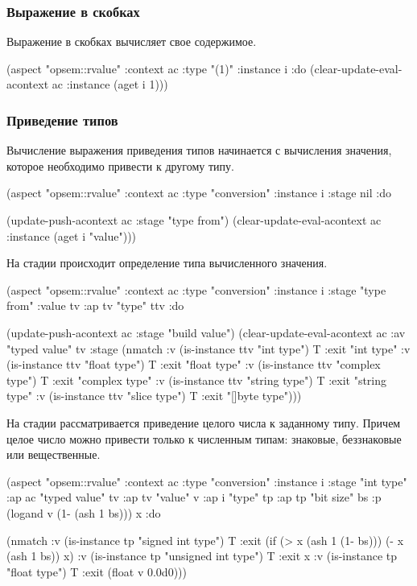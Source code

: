 \documentclass[12pt,twoside,russian]{article}
\newcommand{\textABMLString}[1]{{\color{abmlString}#1}}
\newcommand{\ABMLString}[1]{\abmlinline{\textABMLString{#1}}}
\begin{document}
\subsubsection{Выражение в скобках}
Выражение в скобках вычисляет свое содержимое.

\begin{ABMLCode}
(aspect "opsem::rvalue" :context ac :type "(1)" :instance i :do 
    (clear-update-eval-acontext ac :instance (aget i 1)))
\end{ABMLCode}

\subsubsection{Приведение типов}
Вычисление выражения приведения типов начинается с вычисления значения, которое необходимо привести к другому типу.

\begin{ABMLCode}
(aspect "opsem::rvalue" :context ac :type "conversion" :instance i 
  :stage nil :do 
  
  (update-push-acontext ac :stage "type from")
  (clear-update-eval-acontext ac :instance (aget i "value")))
\end{ABMLCode}

На стадии \ABMLString{type from} происходит определение типа вычисленного значения.

\begin{ABMLCode}
(aspect "opsem::rvalue" :context ac :type "conversion" :instance i 
  :stage "type from" :value tv :ap tv "type" ttv :do 
    
  (update-push-acontext ac :stage "build value")
  (clear-update-eval-acontext ac :av "typed value" tv :stage (nmatch 
  :v (is-instance ttv "int type")     T :exit "int type" 
  :v (is-instance ttv "float type")   T :exit "float type" 
  :v (is-instance ttv "complex type") T :exit "complex type" 
  :v (is-instance ttv "string type")  T :exit "string type" 
  :v (is-instance ttv "slice type")   T :exit "[]byte type")))
\end{ABMLCode}

На стадии \ABMLString{int type} рассматривается приведение целого числа к заданному типу. Причем целое число можно привести только к численным типам: знаковые, беззнаковые или вещественные.

\begin{ABMLCode}
(aspect "opsem::rvalue" :context ac :type "conversion" :instance i 
  :stage "int type" :ap ac "typed value" tv :ap tv "value" v 
  :ap i "type" tp :ap tp "bit size" bs 
  :p (logand v (1- (ash 1 bs))) x :do 
  
  (nmatch 
  :v (is-instance tp "signed int type")   T 
  :exit (if (> x (ash 1 (1- bs))) (- x (ash 1 bs)) x) 
  :v (is-instance tp "unsigned int type") T :exit x 
  :v (is-instance tp "float type")        T :exit (float v 0.0d0)))
\end{ABMLCode}
\end{document}
